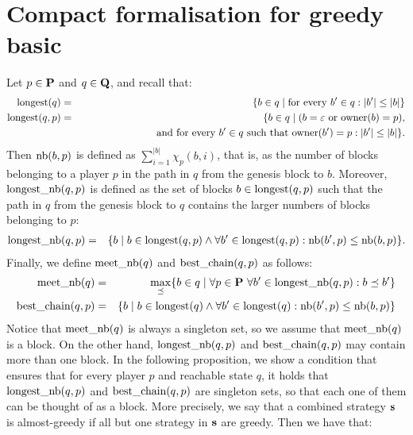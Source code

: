 \documentclass[11pt]{article}
\newcommand{\nb}{\text{\rm nb}}
\newcommand{\lnb}{\text{\rm longest\_nb}}
\newcommand{\meetnb}{\text{\rm meet\_nb}}
\newcommand{\bc}{\text{\rm best\_chain}}
\begin{document}
\section{Compact formalisation for greedy basic}

Let $p \in \mathbf{P}$ and $q \in \mathbf{Q}$, and recall that:
\begin{eqnarray*}
{\text{\rm longest}}(q) & = & \{ b \in q \mid \text{for every } b' \in q: |b'| \leq |b|\}\\
{\text{\rm longest}}(q,p) & = & \{ b \in q \mid (b = \varepsilon \text{ or } \text{\rm owner}(b) = p),\\
&& \hspace{70pt} \text{ and for every } b' \in q \text{ such that } \text{\rm owner}(b') = p : |b'| \leq |b|\}.
\end{eqnarray*}
Then $\nb(b,p)$ is defined as  $\sum_{i=1}^{|b|} \chi_p(b,i)$, that is, as the number of blocks belonging to a player $p$ in the path in $q$ from the genesis block to $b$. Moreover, $\lnb(q,p)$ is defined as the set of blocks $b \in {\text{\rm longest}}(q,p)$ such that the path in $q$ from the genesis block to $q$ contains the larger numbers of blocks belonging to $p$:
\begin{eqnarray*}
\lnb(q,p) & = & \{ b \mid b \in \longest(q,p) \wedge \forall b' \in \longest(q,p): \nb(b',p) \leq \nb(b,p)\}.
\end{eqnarray*}
Finally, we define $\meetnb(q)$ and $\bc(q,p)$ as follows:
\begin{eqnarray*}
\meetnb(q) & = & \max_{\preceq} \{ b \in q \mid \forall p \in \bP \ \forall b' \in \lnb(q,p) : b \preceq b' \} \\
\bc(q,p) & = & \{ b \mid b \in \longest(q) \wedge \forall b' \in \longest(q): \nb(b',p) \leq \nb(b,p)\}
\end{eqnarray*}
Notice that $\meetnb(q)$ is always a singleton set, so we assume that $\meetnb(q)$ is a block. On the other hand, $\lnb(q,p)$ and $\bc(q,p)$ may contain more than one block. In the following 
proposition, we show a condition that ensures that for every player $p$ and reachable state $q$, it holds that $\lnb(q,p)$ and $\bc(q,p)$ are singleton sets, so that each one of them can be thought of as a block. More precisely, we say that a combined strategy $\mathbf{s}$ is almost-greedy if  all but one strategy in $\mathbf{s}$ are greedy. Then we have that:
%
\end{document}
